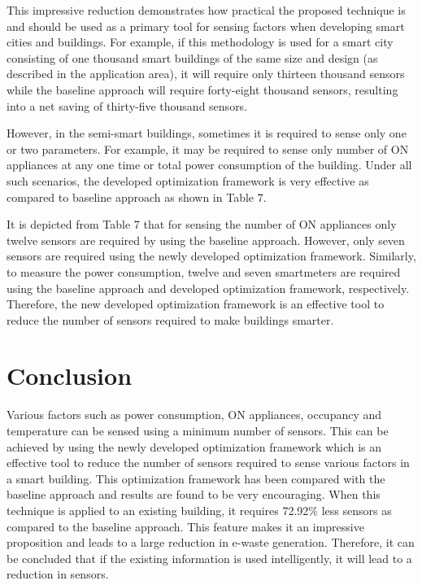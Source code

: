 \documentclass[]{interact}
\theoremstyle{plain}%
\theoremstyle{definition}
\theoremstyle{remark}
\begin{document}
This impressive reduction demonstrates how practical the proposed technique is and should be used as a primary tool for sensing factors when developing smart cities and buildings. For example, if this methodology is used for a smart city consisting of one thousand smart buildings of the same size and design (as described in the application area), it will require only thirteen thousand sensors while the baseline approach will require forty-eight thousand sensors, resulting into a net saving of thirty-five thousand sensors.

However, in the semi-smart buildings, sometimes it is required to sense only one or two parameters. For example, it may be required to sense only number of ON appliances at any one time or total power consumption of the building. Under all such scenarios, the developed optimization framework is very effective as compared to baseline approach as shown in Table 7.

It is depicted from Table 7 that for sensing the number of ON appliances only twelve sensors are required by using the baseline approach. However, only seven sensors are required using the newly developed optimization framework. Similarly, to measure the power consumption, twelve and seven smartmeters are required using the baseline approach and developed optimization framework, respectively. Therefore, the new developed optimization framework is an effective tool to reduce the number of sensors required to make buildings smarter.

\section{Conclusion}

Various factors such as power consumption, ON appliances, occupancy and temperature can be sensed using a minimum number of sensors.  This can be achieved by using the newly developed optimization framework which is an effective tool to reduce the number of sensors required to sense various factors in a smart building. This optimization framework has been compared with the baseline approach and results are found to be very encouraging. When this technique is applied to an existing building, it requires 72.92\% less sensors as compared to the baseline approach. This feature makes it an impressive proposition and leads to a large reduction in e-waste generation. Therefore, it can be concluded that if the existing information is used intelligently, it will lead to a reduction in sensors. 
\end{document}
